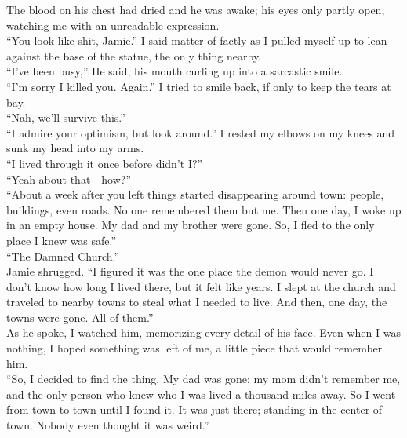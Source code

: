 \documentclass[a5paper]{scrartcl}
\begin{document}
The blood on his chest had dried and he was awake; his eyes only partly open, watching me with an unreadable expression.\\


\enquote{You look like shit, Jamie.} I said matter-of-factly as I pulled myself up to lean against the base of the statue, the only thing nearby.\\


\enquote{I've been busy,} He said, his mouth curling up into a sarcastic smile.\\


\enquote{I'm sorry I killed you. Again.} I tried to smile back, if only to keep the tears at bay.\\


\enquote{Nah, we'll survive this.}\\


\enquote{I admire your optimism, but look around.} I rested my elbows on my knees and sunk my head into my arms.\\


\enquote{I lived through it once before didn't I?}\\


\enquote{Yeah about that - how?}\\


\enquote{About a week after you left things started disappearing around town: people, buildings, even roads. No one remembered them but me. Then one day, I woke up in an empty house. My dad and my brother were gone. So, I fled to the only place I knew was safe.}\\


\enquote{The Damned Church.}\\


Jamie shrugged. \enquote{I figured it was the one place the demon would never go. I don't know how long I lived there, but it felt like years. I slept at the church and traveled to nearby towns to steal what I needed to live. And then, one day, the towns were gone. All of them.}\\


As he spoke, I watched him, memorizing every detail of his face. Even when I was nothing, I hoped something was left of me, a little piece that would remember him.\\


\enquote{So, I decided to find the thing. My dad was gone; my mom didn't remember me, and the only person who knew who I was lived a thousand miles away. So I went from town to town until I found it. It was just there; standing in the center of town. Nobody even thought it was weird.}\\
\end{document}

